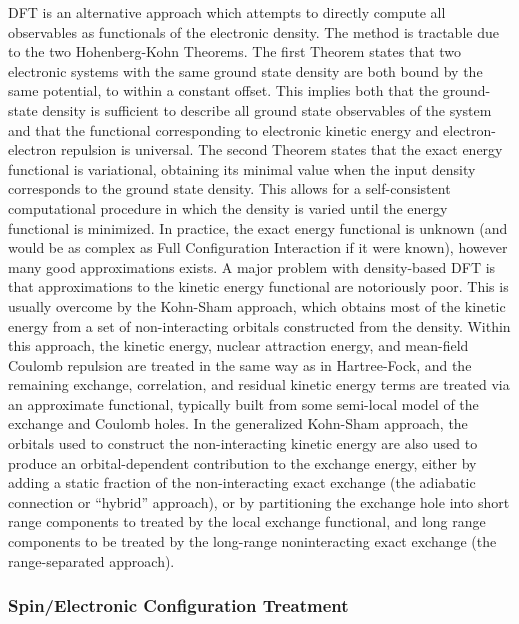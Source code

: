 DFT is an alternative approach which attempts to directly compute all
observables as functionals of the electronic density. The method is tractable
due to the two Hohenberg-Kohn Theorems. The first Theorem states that two
electronic systems with the same ground state density are both bound by the same
potential, to within a constant offset. This implies both that the ground-state
density is sufficient to describe all ground state observables of the system and
that the functional corresponding to electronic kinetic energy and
electron-electron repulsion is universal. The second Theorem states that the
exact energy functional is variational, obtaining its minimal value when the
input density corresponds to the ground state density. This allows for a
self-consistent computational procedure in which the density is varied until the
energy functional is minimized. In practice, the exact energy functional is
unknown (and would be as complex as Full Configuration Interaction if it were
known), however many good approximations exists. A major problem with
density-based DFT is that approximations to the kinetic energy functional are
notoriously poor. This is usually overcome by the Kohn-Sham approach, which
obtains most of the kinetic energy from a set of non-interacting orbitals
constructed from the density. Within this approach, the kinetic energy,
nuclear attraction energy, and mean-field Coulomb repulsion are treated in the
same way as in Hartree-Fock, and the remaining exchange, correlation, and
residual kinetic energy terms are treated via an approximate functional,
typically built from some semi-local model of the exchange and Coulomb holes. In
the generalized Kohn-Sham approach, the orbitals used to construct the
non-interacting kinetic energy are also used to produce an orbital-dependent
contribution to the exchange energy, either by adding a static fraction of the
non-interacting exact exchange (the adiabatic connection or ``hybrid''
approach), or by partitioning the exchange hole into short range components to
treated by the local exchange functional, and long range components to be
treated by the long-range noninteracting exact exchange (the range-separated
approach).

\subsubsection{Spin/Electronic Configuration Treatment}

